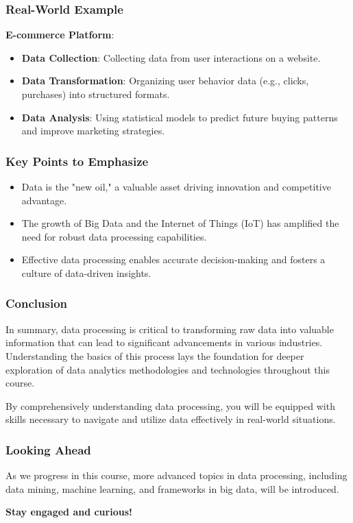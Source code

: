 \documentclass{beamer}
\begin{document}
\begin{frame}[fragile]
    \frametitle{Real-World Example}
    \textbf{E-commerce Platform}:
    \begin{itemize}
        \item \textbf{Data Collection}: Collecting data from user interactions on a website.
        \item \textbf{Data Transformation}: Organizing user behavior data (e.g., clicks, purchases) into structured formats.
        \item \textbf{Data Analysis}: Using statistical models to predict future buying patterns and improve marketing strategies.
    \end{itemize}
\end{frame}

\begin{frame}[fragile]
    \frametitle{Key Points to Emphasize}
    \begin{itemize}
        \item Data is the "new oil," a valuable asset driving innovation and competitive advantage.
        \item The growth of Big Data and the Internet of Things (IoT) has amplified the need for robust data processing capabilities.
        \item Effective data processing enables accurate decision-making and fosters a culture of data-driven insights.
    \end{itemize}
\end{frame}

\begin{frame}[fragile]
    \frametitle{Conclusion}
    In summary, data processing is critical to transforming raw data into valuable information that can lead to significant advancements in various industries. Understanding the basics of this process lays the foundation for deeper exploration of data analytics methodologies and technologies throughout this course.
    
    By comprehensively understanding data processing, you will be equipped with skills necessary to navigate and utilize data effectively in real-world situations.
\end{frame}

\begin{frame}[fragile]
    \frametitle{Looking Ahead}
    As we progress in this course, more advanced topics in data processing, including data mining, machine learning, and frameworks in big data, will be introduced. 

    \textbf{Stay engaged and curious!}
\end{frame}
\end{document}
